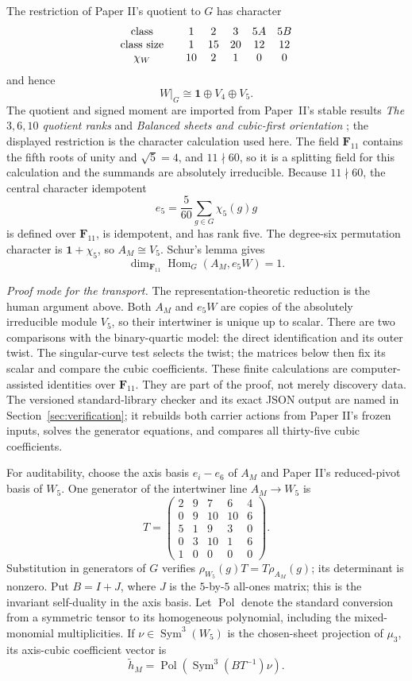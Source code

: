 \documentclass[11pt]{article}
\theoremstyle{definition}
\theoremstyle{remark}
\newcommand{\F}{\mathbf F}
\newcommand{\Sym}{\operatorname{Sym}}
\begin{document}
The restriction of Paper II's quotient to \(G\) has character
\[
\begin{array}{c@{\qquad}ccccc}
\text{class}&1&2&3&5A&5B\\
\text{class size}&1&15&20&12&12\\
\chi_W&10&2&1&0&0
\end{array}
\]
and hence
\[
 W|_G\cong\mathbf1\oplus V_4\oplus V_5.
\]
The quotient and signed moment are imported from Paper~II's stable results
\emph{The \(3,6,10\) quotient ranks} and
\emph{Balanced sheets and cubic-first orientation}
\cite{RuddFactorization2026}; the displayed restriction is the character
calculation used here.  The field \(\F_{11}\) contains the fifth roots of
unity and \(\sqrt5=4\), and \(11\nmid60\), so it is a splitting field for
this calculation and the summands are absolutely irreducible.
Because \(11\nmid60\), the central character idempotent
\[
 e_5=\frac5{60}\sum_{g\in G}\chi_5(g)g
\]
is defined over \(\F_{11}\), is idempotent, and has rank five.  The
degree-six permutation character is \(\mathbf1+\chi_5\), so \(A_M\cong V_5\).
Schur's lemma gives
\[
 \dim_{\F_{11}}\operatorname{Hom}_G(A_M,e_5W)=1.
\]

\noindent\emph{Proof mode for the transport.}
The representation-theoretic reduction is the human argument above.  Both
\(A_M\) and \(e_5W\) are copies of the absolutely irreducible module \(V_5\),
so their intertwiner is unique up to scalar.  There are two comparisons with
the binary-quartic model: the direct identification and its outer twist.
The singular-curve test selects the twist; the matrices below then fix its
scalar and compare the cubic coefficients.  These finite calculations are
computer-assisted identities over \(\F_{11}\).  They are part of the proof,
not merely discovery data.  The versioned standard-library checker and its
exact JSON output are named in Section~\ref{sec:verification}; it rebuilds
both carrier actions from Paper II's frozen inputs, solves the generator
equations, and compares all thirty-five cubic coefficients.

For auditability, choose the axis basis \(e_i-e_6\) of \(A_M\) and Paper
II's reduced-pivot basis of \(W_5\).  One generator of the intertwiner line
\(A_M\to W_5\) is
\[
 T=\begin{pmatrix}
 2&9&7&6&4\\
 0&9&10&10&6\\
 5&1&9&3&0\\
 0&3&10&1&6\\
 1&0&0&0&0
 \end{pmatrix}.
\]
Substitution in generators of \(G\) verifies \(\rho_{W_5}(g)T=
T\rho_{A_M}(g)\); its determinant is nonzero.  Put \(B=I+J\), where \(J\)
is the \(5\)-by-\(5\) all-ones matrix; this is the invariant self-duality in
the axis basis.  Let \(\operatorname{Pol}\) denote the
standard conversion from a symmetric tensor to its homogeneous polynomial,
including the mixed-monomial multiplicities.  If \(\nu\in\Sym^3(W_5)\) is
the chosen-sheet projection of \(\mu_3\), its axis-cubic coefficient vector is
\[
 \widetilde h_M=
 \operatorname{Pol}\!\left(\Sym^3(BT^{-1})\nu\right).
\]
\end{document}
